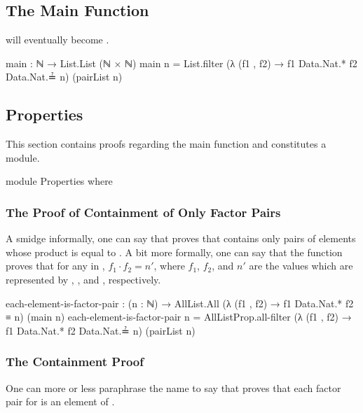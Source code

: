 \documentclass{report}
\begin{document}
\subsection{The Main Function}\label{sec:bifactorNat-main}
 will eventually become .

\begin{code}
  main : ℕ → List.List (ℕ × ℕ)
  main n = List.filter (λ (f1 , f2) → f1 Data.Nat.* f2 Data.Nat.≟ n)
                       (pairList n)
\end{code}

\subsection{Properties}
This section contains proofs regarding the main function and constitutes a module.

\begin{code}
  module Properties where
\end{code}

\subsubsection{The Proof of Containment of Only Factor Pairs}
A smidge informally, one can say that  proves that   contains only pairs of elements whose product is equal to .  A bit more formally, one can say that the function proves that for any  \AgdaOperator{\AgdaInductiveConstructor{,}}  in  , \(f_1 \cdot f_2 = n\prime\), where \(f_1\), \(f_2\), and \(n\prime\) are the values which are represented by , , and , respectively.

\begin{code}
    each-element-is-factor-pair :
      (n : ℕ) →
      AllList.All (λ (f1 , f2) → f1 Data.Nat.* f2 ≡ n) (main n)
    each-element-is-factor-pair n =
      AllListProp.all-filter
        (λ (f1 , f2) → f1 Data.Nat.* f2 Data.Nat.≟ n)
        (pairList n)
\end{code}

\subsubsection{The Containment Proof}
One can more or less paraphrase the name to say that  proves that each factor pair for  is an element of  .
\end{document}
